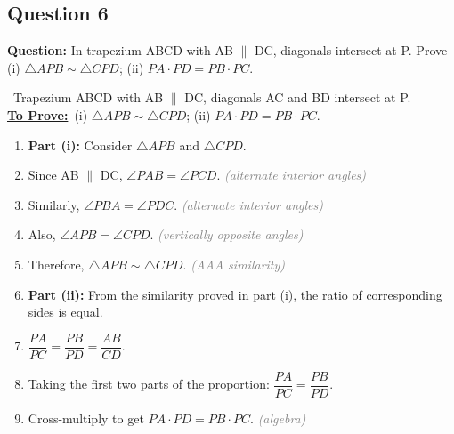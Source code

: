 \documentclass{article}
\newenvironment{steps}{%
  \begin{enumerate}[label=\textcolor{primary}{Step~\arabic*:}, leftmargin=*]
}{\end{enumerate}}
\newcommand{\sul}[1]{\uline{#1}}
\newcommand{\dul}[1]{\uuline{#1}}
\newcommand{\solutionheading}{{\raggedright\dul{\textbf{Solution}}\par}}
\newcommand{\given}[1]{\noindent\textbf{\textcolor{secondary}{\dul{Given:}}}~#1\\}
\newcommand{\toprove}[1]{\noindent\textbf{\textcolor{primary}{\sul{To Prove:}}}~#1\\}
\newcommand{\reason}[1]{\hfill\textit{\textcolor{gray}{(#1)}}}
\begin{document}
\subsection*{Question 6}
\textbf{Question:} In trapezium ABCD with AB $\parallel$ DC, diagonals intersect at P. Prove (i) $\triangle APB\sim\triangle CPD$; (ii) $PA\cdot PD=PB\cdot PC$.

\solutionheading
\given{Trapezium ABCD with AB $\parallel$ DC, diagonals AC and BD intersect at P.}
\toprove{(i) $\triangle APB\sim\triangle CPD$; (ii) $PA\cdot PD=PB\cdot PC$.}

\begin{center}
\end{center}

\begin{steps}
  \item \textbf{Part (i):} Consider $\triangle APB$ and $\triangle CPD$.
  \item Since AB $\parallel$ DC, $\angle PAB = \angle PCD$. \reason{alternate interior angles}
  \item Similarly, $\angle PBA = \angle PDC$. \reason{alternate interior angles}
  \item Also, $\angle APB = \angle CPD$. \reason{vertically opposite angles}
  \item Therefore, $\triangle APB\sim\triangle CPD$. \reason{AAA similarity}
  \item \textbf{Part (ii):} From the similarity proved in part (i), the ratio of corresponding sides is equal.
  \item $\dfrac{PA}{PC} = \dfrac{PB}{PD} = \dfrac{AB}{CD}$.
  \item Taking the first two parts of the proportion: $\dfrac{PA}{PC}=\dfrac{PB}{PD}$.
  \item Cross-multiply to get $PA\cdot PD=PB\cdot PC$. \reason{algebra}
\end{steps}
\end{document}
